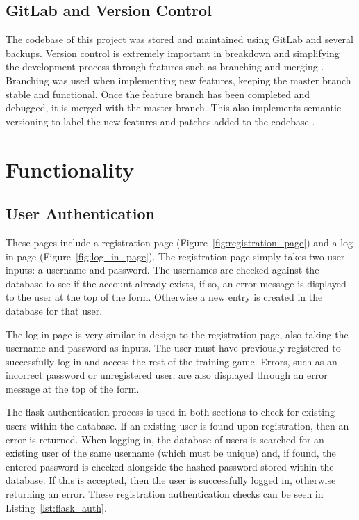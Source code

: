 \documentclass{l4proj}
\begin{document}
\subsection{GitLab and Version Control}
The codebase of this project was stored and maintained using GitLab and several backups. Version control is extremely important in breakdown and simplifying the development process through features such as branching and merging \citep{otte2009version}. Branching was used when implementing new features, keeping the master branch stable and functional. Once the feature branch has been completed and debugged, it is merged with the master branch. This also implements semantic versioning to label the new features and patches added to the codebase \citep{prestonwerner_2022}.

\section{Functionality}

\subsection{User Authentication}
These pages include a registration page (Figure~\ref{fig:registration_page}) and a log in page (Figure~\ref{fig:log_in_page}). The registration page simply takes two user inputs: a username and password. The usernames are checked against the database to see if the account already exists, if so, an error message is displayed to the user at the top of the form. Otherwise a new entry is created in the database for that user.

The log in page is very similar in design to the registration page, also taking the username and password as inputs. The user must have previously registered to successfully log in and access the rest of the training game. Errors, such as an incorrect password or unregistered user, are also displayed through an error message at the top of the form.

The flask authentication process is used in both sections to check for existing users within the database. If an existing user is found upon registration, then an error is returned. When logging in, the database of users is searched for an existing user of the same username (which must be unique) and, if found, the entered password is checked alongside the hashed password stored within the database. If this is accepted, then the user is successfully logged in, otherwise returning an error. These registration authentication checks can be seen in Listing~\ref{lst:flask_auth}.
\end{document}
